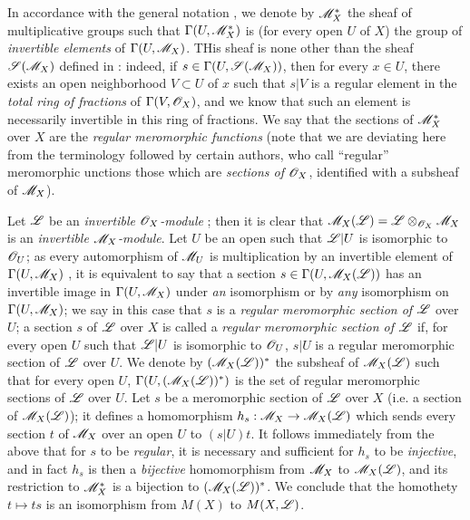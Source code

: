 \begin{env}[20.1.8]
\label{IV.20.1.8}
In accordance with the general notation , we denote by $\mathscr{M}_X^*$ the sheaf of multiplicative groups such that $\Gamma(U,\mathscr{M}_X^*)$ is (for every open $U$ of $X$) the group of \emph{invertible elements} of $\Gamma(U,\mathscr{M}_X)$.
THis sheaf is none other than the sheaf $\mathscr{S}(\mathscr{M}_X)$ defined in : indeed, if $s\in\Gamma(U,\mathscr{S}(\mathscr{M}_X))$, then for every $x\in U$, there exists an open neighborhood $V\subset U$ of $x$ such that $s|V$ is a regular element in the \emph{total ring of fractions} of $\Gamma(V,\mathscr{O}_X)$, and we know that such an element is necessarily invertible in this ring of fractions.
We say that the sections of $\mathscr{M}_X^*$ over $X$ are the \emph{regular meromorphic functions} (note that we are deviating here from the terminology followed by certain authors, who call ``regular'' meromorphic unctions those which are \emph{sections of $\mathscr{O}_X$}, identified with a subsheaf of $\mathscr{M}_X$).

Let $\mathscr{L}$ be an \emph{invertible $\mathscr{O}_X$-module} ;
then it is clear that $\mathscr{M}_X(\mathscr{L})=\mathscr{L}\otimes_{\mathscr{O}_X}\mathscr{M}_X$
is an \emph{invertible $\mathscr{M}_X$-module}.
Let $U$ be an open such that $\mathscr{L}|U$ is isomorphic to $\mathscr{O}_U$;
as every automorphism of $\mathscr{M}_U$ is multiplication by an invertible element of $\Gamma(U,\mathscr{M}_X)$ , it is equivalent to say that a section $s\in\Gamma(U,\mathscr{M}_X(\mathscr{L}))$ has an invertible image in $\Gamma(U,\mathscr{M}_X)$ under \emph{an} isomorphism or by \emph{any} isomorphism on $\Gamma(U,\mathscr{M}_X)$;
we say in this case that $s$ is a \emph{regular meromorphic section of $\mathscr{L}$} over $U$;
a section $s$ of $\mathscr{L}$ over $X$ is called a \emph{regular meromorphic section of $\mathscr{L}$} if, for every open $U$ such that $\mathscr{L}|U$ is isomorphic to $\mathscr{O}_U$, $s|U$ is a regular meromorphic section of $\mathscr{L}$ over $U$.
We denote by $(\mathscr{M}_X(\mathscr{L}))^*$ the subsheaf of $\mathscr{M}_X(\mathscr{L})$ such that for every open $U$, $\Gamma(U,(\mathscr{M}_X(\mathscr{L}))^*)$ is the set of regular meromorphic sections of $\mathscr{L}$ over $U$.
Let $s$ be a meromorphic section of $\mathscr{L}$ over $X$ (i.e. a section of $\mathscr{M}_X(\mathscr{L})$);
it defines a homomorphism $h_s:\sh{M}_X\to\sh{M}_X(\sh{L})$ which sends every section $t$ of $\mathscr{M}_X$ over an open $U$ to $(s|U)t$.
It follows immediately from the above that for $s$ to be \emph{regular}, it is necessary and sufficient for $h_s$ to be \emph{injective}, and in fact $h_s$ is then a \emph{bijective} homomorphism from $\mathscr{M}_X$ to $\mathscr{M}_X(\mathscr{L})$, and its restriction to $\mathscr{M}_X^*$ is a bijection to $(\mathscr{M}_X(\mathscr{L}))^*$.
We conclude that the homothety $t\mapsto ts$ is an isomorphism from $M(X)$ to $M(X,\mathscr{L})$.
\end{env}

